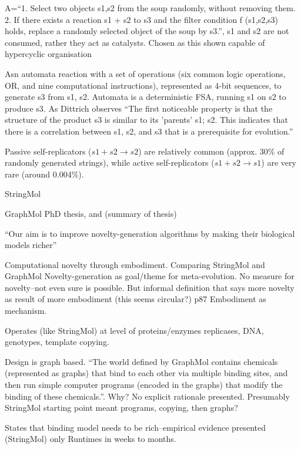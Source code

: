 A=``1. Select two objects s1,s2 from the soup randomly, without removing them. 2. If there exists a reaction s1 + s2 to s3 and the filter condition f (s1,s2,s3) holds, replace a randomly selected object of the soup by s3.'', s1 and s2 are not consumed, rather they act as catalysts. Chosen as this shown capable of hypercyclic organisation

Asn automata reaction with a set of operations (six common logic operations, \eg OR, and nine computational instructions), represented as 4-bit sequences, to generate s3 from s1, s2. Automata is a deterministic FSA, running s1 on s2 to produce s3. As Dittrich observes ``The first noticeable property is that the structure of the product s3 is similar to its 'parents' s1; s2. This indicates that there is a correlation between s1, s2, and s3 that is a prerequisite for evolution.''

Passive self-replicators ($s1 + s2 \rightarrow s2$) are relatively common (approx. 30\% of randomly generated strings), while active self-replicators ($s1 + s2 \rightarrow s1$) are very rare (around 0.004\%).

StringMol \parencite{Hickinbotham2011}



GraphMol \parencite{Nellis2012} PhD thesis, and \parencite{Nellis2014} (summary of thesis)

``Our aim is to improve novelty-generation algorithms by making their biological models richer''

Computational novelty through embodiment. Comparing StringMol and GraphMol
Novelty-generation as goal/theme for meta-evolution. No measure for novelty--not even sure is possible. But informal definition that says more novelty as result of more embodiment (this seems circular?) p87 Embodiment as mechanism. 

Operates (like StringMol) at level of proteins/enzymes \eg replicases, DNA, genotypes, template copying.

Design is graph based. ``The world defined by GraphMol contains chemicals (represented as graphs) that bind to each other via multiple binding sites, and then run simple computer programs (encoded in the graphs) that modify the binding of these chemicals.''. Why? No explicit rationale presented. Presumably StringMol starting point meant programs, copying, then graphs? 

States that binding model needs to be rich--empirical evidence presented (StringMol) only
Runtimes in weeks to months.

